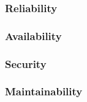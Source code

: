 
\subsubsection{Reliability}


\subsubsection{Availability}


\subsubsection{Security}


\subsubsection{Maintainability}

